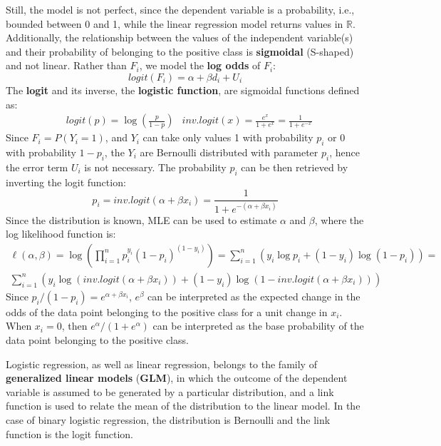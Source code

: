 Still, the model is not perfect, since the dependent variable is a probability, i.e., bounded between 0 and 1, while the linear regression model returns values in $\mathbb{R}$. Additionally, the relationship between the values of the independent variable(s) and their probability of belonging to the positive class is \textbf{sigmoidal} (S-shaped) and not linear. Rather than $F_i$, we model the \textbf{log odds} of $F_i$:
\begin{equation*}
    \textit{logit}(F_i) = \alpha + \beta d_i + U_i
\end{equation*}
The \textbf{logit} and its inverse, the \textbf{logistic function}, are sigmoidal functions defined as:
\begin{align*}
    &\textit{logit}(p) = \log\left(\frac{p}{1-p}\right) &\textit{inv.logit}(x) = \frac{e^x}{1+e^x} = \frac{1}{1+e^{-x}}
\end{align*}
Since $F_i = P(Y_i = 1)$, and $Y_i$ can take only values 1 with probability $p_i$ or 0 with probability $1-p_i$, the $Y_i$ are Bernoulli distributed with parameter $p_i$, hence the error term $U_i$ is not necessary. The probability $p_i$ can be then retrieved by inverting the logit function:
\begin{equation*}
    p_i = \textit{inv.logit}(\alpha + \beta x_i) = \frac{1}{1 + e^{-(\alpha + \beta x_i)}}
\end{equation*}
Since the distribution is known, MLE can be used to estimate $\alpha$ and $\beta$, where the log likelihood function is:
\begin{gather*}
    \ell(\alpha, \beta) = \log \left(\prod_{i=1}^n p_i^{y_i} (1-p_i)^{(1-y_i)}  \right) = \sum_{i=1}^n (y_i \log p_i + (1-y_i) \log(1-p_i)) =\\
    \sum_{i=1}^n (y_i \log(\textit{inv.logit}(\alpha + \beta x_i)) + (1-y_i) \log(1-\textit{inv.logit}(\alpha + \beta x_i)))
\end{gather*}
Since $p_i/(1-p_i) = e^{\alpha + \beta x_i}$, $e^{\beta}$ can be interpreted as the expected change in the odds of the data point belonging to the positive class for a unit change in $x_i$. When $x_i = 0$, then $e^{\alpha}/(1 + e^{\alpha})$ can be interpreted as the base probability of the data point belonging to the positive class.

Logistic regression, as well as linear regression, belongs to the family of \textbf{generalized linear models} (\textbf{GLM}), in which the outcome of the dependent variable is assumed to be generated by a particular distribution, and a link function is used to relate the mean of the distribution to the linear model. In the case of binary logistic regression, the distribution is Bernoulli and the link function is the logit function.